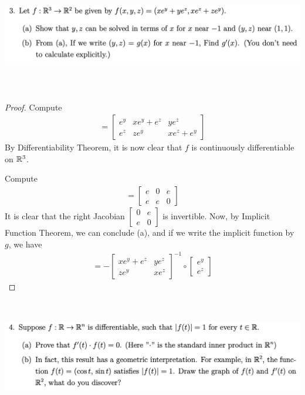 \documentclass{report}
\begin{document}
\begin{question}{}{}
\includegraphics[height=5cm,width=18cm]{hw6a3}
\end{question}
\begin{proof}
Compute 
\begin{align*}
[df]=\begin{bmatrix}
  e^y & xe^y+e^z & ye^z \\
  e^z & ze^y & xe^z+e^y
\end{bmatrix}
\end{align*}
By Differentiability Theorem, it is now clear that $f$ is continuously differentiable on $\mathbb{R}^3$. 

Compute 
\begin{align*}
[df_{(-1,1,1)}]=\begin{bmatrix}
  e & 0 & e \\
  e & e & 0
\end{bmatrix}
\end{align*}
It is clear that the right Jacobian $\begin{bmatrix}
  0 & e \\
  e & 0
\end{bmatrix}$ is invertible. Now, by Implicit Function Theorem, we can conclude (a), and if we write the implicit function by $g$, we have 
\begin{align*}
[dg_x]= -\begin{bmatrix}
  xe^y + e^z & ye^z \\
  ze^y & xe^z
\end{bmatrix}^{-1} \circ \begin{bmatrix}
e^y\\
e^z
\end{bmatrix}
\end{align*}
\end{proof}
\begin{question}{}{}
\includegraphics[height=5cm,width=18cm]{hw6a4}
\end{question}
\end{document}
